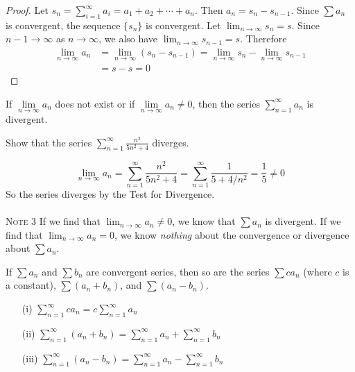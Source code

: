   \begin{proof}\let\qed\relax
    Let $s_n = \sum_{i=1}^{\infty}a_i = a_1 +a_2 + \cdots + a_n$. Then $a_n = s_n - s_{n-1}$. Since $\sum a_n$ is convergent, the sequence $\{s_n\}$ is convergent. Let $\lim_{n\to\infty} s_n = s$. Since $n-1 \to \infty$ as $n\to\infty$, we also have $\lim_{n\to\infty} s_{n-1} = s$. Therefore
    \begin{align*}
      \lim_{n\to\infty} a_n &= \lim_{n\to\infty} (s_n - s_{n-1}) = \lim_{n\to\infty} s_n - \lim_{n\to\infty} s_{n-1} \\
      &= s-s = 0
    \end{align*}
  \end{proof}
  \begin{definition}
    If $\lim\limits_{n\to\infty} a_n$ does not exist or if $\lim\limits_{n\to\infty} a_n \neq 0$, then the series $ \displaystyle\sum_{n=1}^{\infty} a_n$ is divergent.
  \end{definition}
  \begin{example}
    Show that the series $ \displaystyle\sum_{n=1}^{\infty} \frac{n^2}{5n^2+4}$ diverges.
  \end{example}
  \begin{solution}
    $$ \lim_{n\to\infty} a_n = \sum_{n=1}^{\infty} \frac{n^2}{5n^2+4} = \sum_{n=1}^{\infty} \frac{1}{5+4/n^2} = \frac{1}{5} \neq 0$$
    So the series diverges by the Test for Divergence.
    \\~\\
    \textsc{Note 3} If we find that $\lim_{n\to\infty} a_n \neq 0$, we know that $\sum a_n$ is divergent. If we find that $\lim_{n\to\infty} a_n = 0$, we know \textit{nothing} about the convergence or divergence about $\sum a_n$.
  \end{solution}
  \begin{theorem}
    If $\sum a_n$ and $\sum b_n$ are convergent series, then so are the series $\sum ca_n$ (where $c$ is a constant), $\sum (a_n+b_n)$, and $\sum (a_n-b_n)$.
    \begin{enumerate}
      \item[(i)] $ \displaystyle\sum_{n=1}^{\infty} ca_n = c\sum_{n=1}^{\infty} a_n$
      \item[(ii)] $ \displaystyle\sum_{n=1}^{\infty} (a_n + b_n) = \sum_{n=1}^{\infty} a_n + \sum_{n=1}^{\infty} b_n$
      \item[(iii)] $ \displaystyle\sum_{n=1}^{\infty} (a_n - b_n) = \sum_{n=1}^{\infty} a_n - \sum_{n=1}^{\infty} b_n$
    \end{enumerate}
  \end{theorem}
